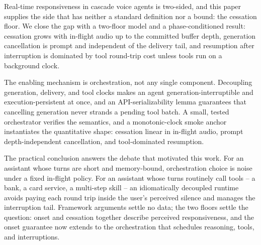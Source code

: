 Real-time responsiveness in cascade voice agents is two-sided, and this paper supplies the side
that has neither a standard definition nor a bound: the cessation floor.
We close the gap with a two-floor model and a phase-conditioned result: cessation grows with
in-flight audio up to the committed buffer depth, generation cancellation is prompt and
independent of the delivery tail, and resumption after interruption is dominated by tool
round-trip cost unless tools run on a background clock.

The enabling mechanism is orchestration, not any single component.
Decoupling generation, delivery, and tool clocks makes an agent generation-interruptible and
execution-persistent at once, and an API-serializability lemma guarantees that cancelling
generation never strands a pending tool batch.
A small, tested orchestrator verifies the semantics, and a monotonic-clock smoke anchor
instantiates the quantitative shape: cessation linear in in-flight audio, prompt
depth-independent cancellation, and tool-dominated resumption.

The practical conclusion answers the debate that motivated this work.
For an assistant whose turns are short and memory-bound, orchestration choice is noise under a
fixed in-flight policy.
For an assistant whose turns routinely call tools -- a bank, a card service, a multi-step
skill -- an idiomatically decoupled runtime avoids paying each round trip inside the
user's perceived silence and manages the interruption tail.
Framework arguments settle no data; the two floors settle the question: onset and cessation
together describe perceived responsiveness, and the onset guarantee now extends to the
orchestration that schedules reasoning, tools, and interruptions.
